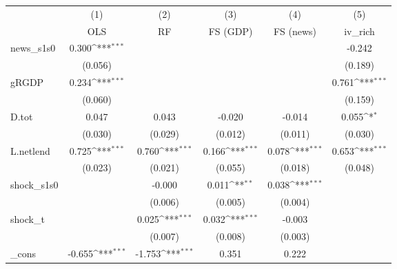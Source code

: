 {
\def\sym#1{\ifmmode^{#1}\else\(^{#1}\)\fi}
\begin{tabular}{l*{5}{c}}
\toprule
            &\multicolumn{1}{c}{(1)}&\multicolumn{1}{c}{(2)}&\multicolumn{1}{c}{(3)}&\multicolumn{1}{c}{(4)}&\multicolumn{1}{c}{(5)}\\
            &\multicolumn{1}{c}{OLS}&\multicolumn{1}{c}{RF}&\multicolumn{1}{c}{FS (GDP)}&\multicolumn{1}{c}{FS (news)}&\multicolumn{1}{c}{iv\_rich}\\
\midrule
news\_s1s0   &       0.300\sym{***}&                     &                     &                     &      -0.242         \\
            &     (0.056)         &                     &                     &                     &     (0.189)         \\
\addlinespace
gRGDP       &       0.234\sym{***}&                     &                     &                     &       0.761\sym{***}\\
            &     (0.060)         &                     &                     &                     &     (0.159)         \\
\addlinespace
D.tot       &       0.047         &       0.043         &      -0.020         &      -0.014         &       0.055\sym{*}  \\
            &     (0.030)         &     (0.029)         &     (0.012)         &     (0.011)         &     (0.030)         \\
\addlinespace
L.netlend   &       0.725\sym{***}&       0.760\sym{***}&       0.166\sym{***}&       0.078\sym{***}&       0.653\sym{***}\\
            &     (0.023)         &     (0.021)         &     (0.055)         &     (0.018)         &     (0.048)         \\
\addlinespace
shock\_s1s0  &                     &      -0.000         &       0.011\sym{**} &       0.038\sym{***}&                     \\
            &                     &     (0.006)         &     (0.005)         &     (0.004)         &                     \\
\addlinespace
shock\_t     &                     &       0.025\sym{***}&       0.032\sym{***}&      -0.003         &                     \\
            &                     &     (0.007)         &     (0.008)         &     (0.003)         &                     \\
\addlinespace
\_cons      &      -0.655\sym{***}&      -1.753\sym{***}&       0.351         &       0.222         &                     \\

\end{tabular}}
